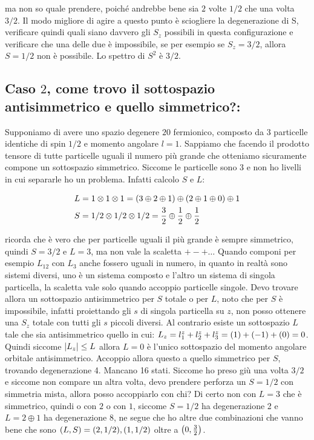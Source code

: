 	ma non so quale prendere, poiché andrebbe bene sia $2$ volte $1/2$ che una volta $3/2$. Il modo migliore di agire a questo punto è sciogliere la degenerazione di S, verificare quindi quali siano davvero gli $S_z$ possibili in questa configurazione e verificare che una delle due è impossibile, se per esempio se $S_z = 3/2$, allora $S = 1/2$ non è possibile. Lo spettro di $S^2$ è $3/2$. 

\subsection{Caso $2$, come trovo il sottospazio antisimmetrico e quello simmetrico?:}
	
	Supponiamo di avere uno spazio degenere $20$ fermionico, composto da 3 particelle identiche di spin $1/2$ e momento angolare $l = 1$. Sappiamo che facendo il prodotto tensore di tutte particelle uguali il numero più grande che otteniamo sicuramente compone un sottospazio simmetrico. Siccome le particelle sono 3 e non ho livelli in cui separarle ho un problema. Infatti calcolo $S$ e $L$:
	
\begin{align*}
	& L = 1 \otimes 1 \otimes 1 = (3 \oplus 2 \oplus 1) \oplus \qty(2 \oplus 1 \oplus 0) \oplus 1 \\
	& S = 1/2 \otimes 1/2 \otimes 1/2 = \frac{3}{2} \oplus \frac{1}{2} \oplus \frac{1}{2}
\end{align*}

	ricorda che è vero che per particelle uguali il più grande è sempre simmetrico, quindi $S = 3/2$ e $L = 3$, ma non vale la scaletta $+-+ \ldots$ Quando componi per esempio $L_{12}$ con $L_3$ anche fossero uguali in numero, in quanto in realtà sono sistemi diversi, uno è un sistema composto e l'altro un sistema di singola particella, la scaletta vale solo quando accoppio particelle singole. Devo trovare allora un sottospazio antisimmetrico per $S$ totale o per $L$, noto che per $S$ è impossibile, infatti proiettando gli $s$ di singola particella su $z$, non posso ottenere una $S_z$ totale con tutti gli $s$ piccoli diversi. Al contrario esiste un sottospazio $L$ tale che sia antisimmetrico quello in cui: $L_z = l_1^z + l_2^z + l_3^z =  \qty(1) + \qty( -1 ) +\qty(0) = 0$. Quindi siccome $\qty|L_z| \leq L$ allora $L = 0$ è l'unico sottospazio del momento angolare orbitale antisimmetrico. Accoppio allora questo a quello simmetrico per $S$, trovando degenerazione 4. Mancano 16 stati. Siccome ho preso giù una volta $3/2$ e siccome non compare un altra volta, devo prendere perforza un $S = 1/2$ con simmetria mista, allora posso accoppiarlo con chi? Di certo non con $L = 3$ che è simmetrico, quindi o con $2$ o con $1$, siccome $S = 1/2$ ha degenerazione 2 e $L = 2 \oplus 1$ ha degenerazione $8$, ne segue che ho altre due combinazioni che vanno bene che sono $\qty(L, S) = \qty(2, 1/2), \qty(1, 1/2)$ oltre a $\qty(0, \frac{3}{2})$.


